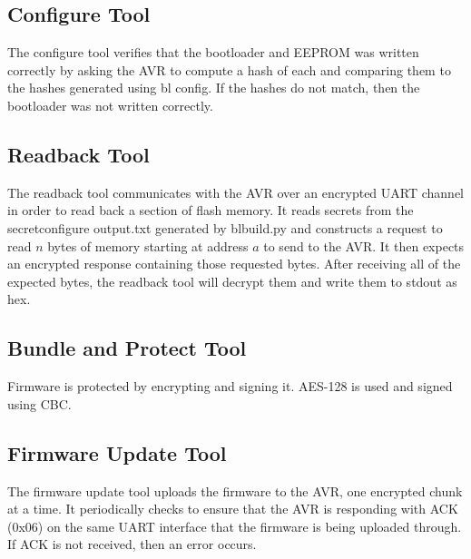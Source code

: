 \documentclass[11pt]{article}
\begin{document}
\subsection{Configure Tool}
The configure tool verifies that the bootloader and EEPROM was written correctly by asking the AVR to compute a hash of each and comparing them to the hashes generated using bl \textunderscore config. If the hashes do not match, then the bootloader was not written correctly.
\subsection{Readback Tool}
The readback tool communicates with the AVR over an encrypted UART channel in order to read back a section of flash memory. It reads secrets from the secret\textunderscore configure \textunderscore output.txt generated by bl\textunderscore build.py and constructs a request to read $n$ bytes of memory starting at address $a$ to send to the AVR. It then expects an encrypted response containing those requested bytes. After receiving all of the expected bytes, the readback tool will decrypt them and write them to stdout as hex. 
\subsection{Bundle and Protect Tool}
Firmware is protected by encrypting and signing it. AES-128 is used and signed using CBC.
\subsection{Firmware Update Tool}
The firmware update tool uploads the firmware to the AVR, one encrypted chunk at a time. It periodically checks to ensure that the AVR is responding with ACK (0x06) on the same UART interface that the firmware is being uploaded through. If ACK is not received, then an error occurs.
\end{document}
